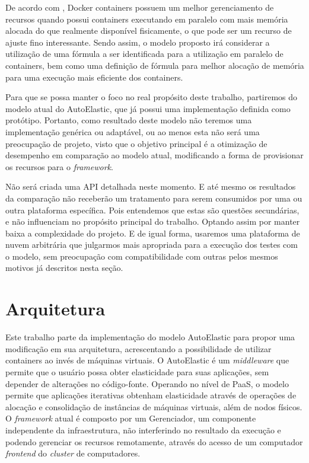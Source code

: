 \documentclass[twoside,english,brazilian]{UNISINOSartigo}
\begin{document}
De acordo com , Docker containers possuem um melhor gerenciamento de recursos quando possui containers executando em paralelo com mais memória alocada do que realmente disponível fisicamente, o que pode ser um recurso de ajuste fino interessante. Sendo assim, o modelo proposto irá considerar a utilização de uma fórmula a ser identificada para a utilização em paralelo de containers, bem como uma definição de fórmula para melhor alocação de memória para uma execução mais eficiente dos containers.

Para que se possa manter o foco no real propósito deste trabalho, partiremos do modelo atual do AutoElastic, que já possui uma implementação definida como protótipo. Portanto, como resultado deste modelo não teremos uma implementação genérica ou adaptável, ou ao menos esta não será uma preocupação de projeto, visto que o objetivo principal é a otimização de desempenho em comparação ao modelo atual, modificando a forma de provisionar os recursos para o \textit{framework}. 

Não será criada uma API detalhada neste momento. E até mesmo os resultados da comparação não receberão um tratamento para serem consumidos por uma ou outra plataforma específica. Pois entendemos que estas são questões secundárias, e não influenciam no propósito principal do trabalho. Optando assim por manter baixa a complexidade do projeto. E de igual forma, usaremos uma plataforma de nuvem arbitrária que julgarmos mais apropriada para a execução dos testes com o modelo, sem preocupação com compatibilidade com outras pelos mesmos motivos já descritos nesta seção.

\section{Arquitetura}
\label{arquitetura}

Este trabalho parte da implementação do modelo AutoElastic para propor uma modificação em sua arquitetura, acrescentando a possibilidade de utilizar containers ao invés de máquinas virtuais. O AutoElastic é um \textit{middleware} que permite que o usuário possa obter elasticidade para suas aplicações, sem depender de alterações no código-fonte. Operando no nível de PaaS, o modelo permite que aplicações iterativas obtenham elasticidade através de operações de alocação e consolidação de instâncias de máquinas virtuais, além de nodos físicos. O \textit{framework} atual é composto por um Gerenciador, um componente independente da infraestrutura, não interferindo no resultado da execução e podendo gerenciar os recursos remotamente, através do acesso de um computador \textit{frontend} do \textit{cluster} de computadores.
\end{document}

